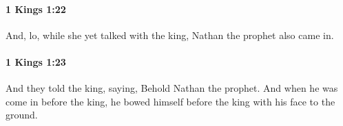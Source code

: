 		\paragraph{1 Kings 1:22} %
			\label{1KINGS-1-22}

			And, lo, while she yet talked with the king, Nathan the prophet also came in.


		\paragraph{1 Kings 1:23} %
			\label{1KINGS-1-23}

			And they told the king, saying, Behold Nathan the prophet. And when he was come in before the king, he bowed himself before the king with his face to the ground.


